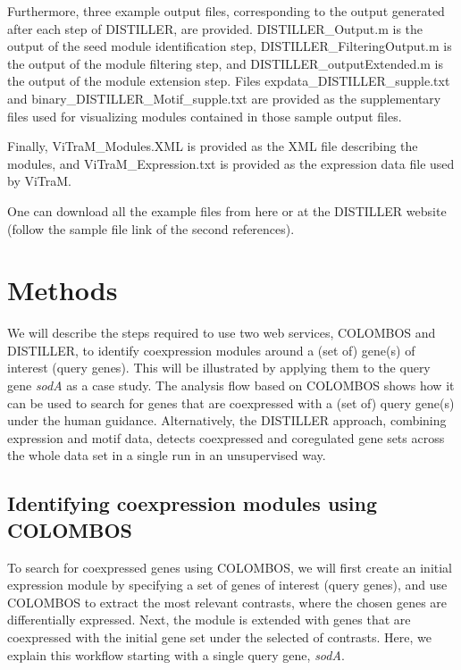 Furthermore, three example output files, corresponding to the output generated
after each step of DISTILLER, are provided. DISTILLER\_Output.m is the output of
the seed module identification step, DISTILLER\_FilteringOutput.m is the output
of the module filtering step, and DISTILLER\_outputExtended.m is the output of
the module extension step. Files expdata\_DISTILLER\_supple.txt and
binary\_DISTILLER\_Motif\_supple.txt are provided as the supplementary files 
used for visualizing modules contained in those sample output files.

Finally, ViTraM\_Modules.XML is provided as the XML file describing the modules,
and ViTraM\_Expression.txt is provided as the expression data file used by
ViTraM.

One can download all the example files from here \cite{DISTILLER-sample} or at 
the DISTILLER website \cite{DISTILLER} (follow the sample file link of the 
second references).




\section{Methods}

We will describe the steps required to use two web services, COLOMBOS and
DISTILLER, to identify coexpression modules around a (set of) gene(s) of
interest (query genes). This will be illustrated by applying them to the query
gene \textit{sodA} as a case study.  
%
The analysis flow based on COLOMBOS shows how it can be used to search for
genes that are coexpressed with a (set of) query gene(s) under the human
guidance.  Alternatively, the DISTILLER approach, combining expression and
motif data, detects coexpressed and coregulated gene sets across the whole
data set in a single run in an unsupervised way.


\subsection{Identifying coexpression modules using COLOMBOS}\label{sec:dist-module-colombos}

To search for coexpressed genes using COLOMBOS, we will first create an initial
expression module by specifying a set of genes of interest (query genes), and
use COLOMBOS to extract the most relevant contrasts, where the chosen genes are
differentially expressed.  Next, the module is extended with genes that are
coexpressed with the initial gene set under the selected of contrasts. Here, we
explain this workflow starting with a single query gene, \textit{sodA}.

